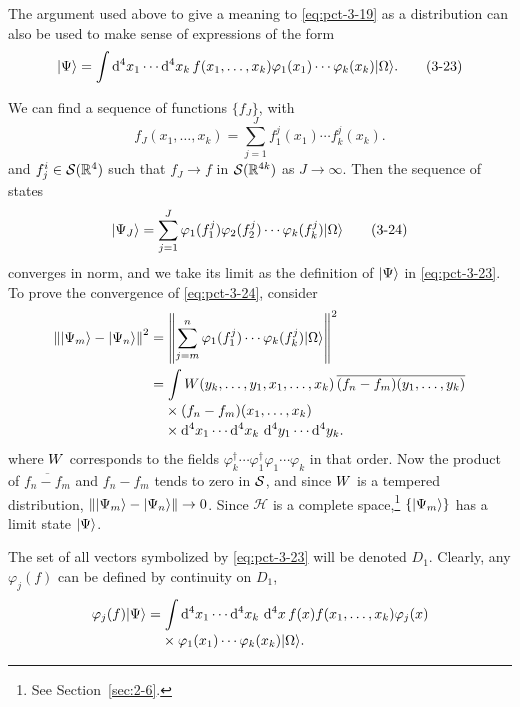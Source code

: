 The argument used above to give a meaning to \eqref{eq:pct-3-19} as a distribution can
also be used to make sense of expressions of the form
\begin{equation}
 \lvert \Psi\rangle=\int \mathop{}\!\mathrm{d}^4x_1\cdots\mathop{}\!\mathrm{d}^4x_k\,
 f(x_1,\ldots,x_k)\varphi_1(x_1)\cdots\varphi_k(x_k)\lvert \Omega\rangle.
 \tag{3-23}\label{eq:pct-3-23}
\end{equation}

We can find a sequence of functions $\{f_J\}$, with
\begin{equation*}
 f_J(x_1,\ldots,x_k)=\sum_{j=1}^{J}f_1^j(x_1)\cdots f_k^j(x_k).
\end{equation*}
and $f_j^i\in\mathcal{S}(\mathbb{R}^4)$ such that $f_J\to f$ in
$\mathcal{S}(\mathbb{R}^{4k})$ as $J\to\infty$. Then the sequence of states
\begin{equation}
 \lvert \Psi_J\rangle=\sum_{j=1}^{J}
 \varphi_1(f_1^j)\varphi_2(f_2^j)\cdots\varphi_k(f_k^j)\lvert \Omega\rangle
 \tag{3-24}\label{eq:pct-3-24}
\end{equation}
converges in norm, and we take its limit as the definition of $\lvert \Psi\rangle$
in \eqref{eq:pct-3-23}. To prove the convergence of \eqref{eq:pct-3-24}, consider
\begin{equation*}
 \begin{aligned}
  \left\|\ket{\Psi_m}-\ket{\Psi_n}\right\|^2
  &=\left\|
    \sum_{j=m}^{n}\varphi_1(f_1^j)\cdots\varphi_k(f_k^j)\ket{\Omega}
    \right\|^2\\
  &=\int \Wightman(y_k,\ldots,y_1,x_1,\ldots,x_k)\,
   \overline{(f_n-f_m)(y_1,\ldots,y_k)}\\[-2pt]
  &\phantom{={}}\times(f_n-f_m)(x_1,\ldots,x_k)\\[-2pt]
  &\phantom{={}}\times\dd^4x_1\cdots\dd^4x_k\,
    \dd^4y_1\cdots\dd^4y_k .
 \end{aligned}
\end{equation*}
where $W$ corresponds to the fields
$\varphi_k^\dagger\cdots\varphi_1^\dagger\varphi_1\cdots\varphi_k$ in that order.
Now the product of $\overline{f_n-f_m}$ and $f_n-f_m$ tends to zero in
$\mathcal{S}$, and since $W$ is a tempered distribution,
$\left\|\lvert \Psi_m\rangle-\lvert \Psi_n\rangle\right\|\to0$. Since $\mathcal{H}$ is a
complete space,\footnote{See Section~\ref{sec:2-6}.} $\{\lvert \Psi_m\rangle\}$ has a limit
state $\lvert \Psi\rangle$.

The set of all vectors symbolized by \eqref{eq:pct-3-23} will be denoted $D_1$. Clearly,
any $\varphi_j(f)$ can be defined by continuity on $D_1$,
\begin{equation*}
 \begin{aligned}
 \varphi_j(f)\ket{\Psi}
 &=\int \dd^4x_1\cdots\dd^4x_k\,\dd^4x\,
 f(x)f(x_1,\ldots,x_k)\varphi_j(x)\\[-2pt]
 &\phantom{={}}\times\varphi_1(x_1)\cdots\varphi_k(x_k)\ket{\Omega}.
 \end{aligned}
\end{equation*}

